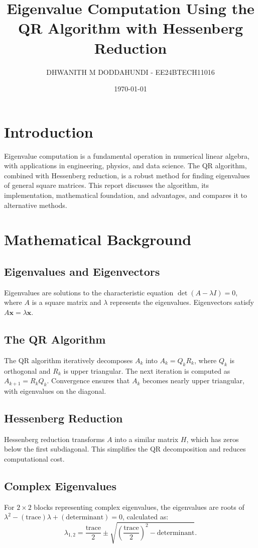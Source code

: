 \documentclass[12pt,a4paper]{article}
\title{\textbf{Eigenvalue Computation Using the QR Algorithm with Hessenberg Reduction}}
\author{DHWANITH M DODDAHUNDI - EE24BTECH11016}
\date{\today}
\begin{document}
\maketitle
\tableofcontents
\newpage

\section{Introduction}
Eigenvalue computation is a fundamental operation in numerical linear algebra, with applications in engineering, physics, and data science. The QR algorithm, combined with Hessenberg reduction, is a robust method for finding eigenvalues of general square matrices. This report discusses the algorithm, its implementation, mathematical foundation, and advantages, and compares it to alternative methods.

\section{Mathematical Background}
\subsection{Eigenvalues and Eigenvectors}
Eigenvalues are solutions to the characteristic equation \( \det(A - \lambda I) = 0 \), where \( A \) is a square matrix and \( \lambda \) represents the eigenvalues. Eigenvectors satisfy \( A \mathbf{x} = \lambda \mathbf{x} \).

\subsection{The QR Algorithm}
The QR algorithm iteratively decomposes \( A_k \) into \( A_k = Q_k R_k \), where \( Q_k \) is orthogonal and \( R_k \) is upper triangular. The next iteration is computed as \( A_{k+1} = R_k Q_k \). Convergence ensures that \( A_k \) becomes nearly upper triangular, with eigenvalues on the diagonal.

\subsection{Hessenberg Reduction}
Hessenberg reduction transforms \( A \) into a similar matrix \( H \), which has zeros below the first subdiagonal. This simplifies the QR decomposition and reduces computational cost.

\subsection{Complex Eigenvalues}
For \( 2 \times 2 \) blocks representing complex eigenvalues, the eigenvalues are roots of \( \lambda^2 - (\text{trace})\lambda + (\text{determinant}) = 0 \), calculated as:
\[
\lambda_{1,2} = \frac{\text{trace}}{2} \pm \sqrt{\left(\frac{\text{trace}}{2}\right)^2 - \text{determinant}}.
\]
\end{document}
